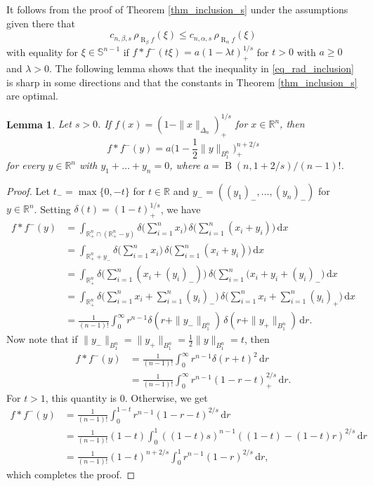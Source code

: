 \documentclass{amsart}
\newtheorem{lemma}[theorem]{Lemma}
\newcommand{\omr}[1]{\operatorname{R}_{#1}\!}
\newcommand{\R}{\mathbb R}
\newcommand{\sn}{{\mathbb S}^{n-1}}
\newcommand{\Beta}{\operatorname{B}}
\renewcommand{\d}{\,\mathrm{d}}
\newcommand{\pl}[1]{#1_{\scriptscriptstyle +}}
\newcommand{\mn}[1]{#1_{\scriptscriptstyle -}}
\begin{document}
It follows from the proof of Theorem \ref{thm_inclusion_s} under the assumptions given there that
\begin{equation}\label{eq_rad_inclusion}
c_{n,\beta,s}\, \rho_{\omr \beta f}(\xi)
\leq  
c_{n,\alpha,s}\, \rho_{\omr \alpha f}(\xi)
\end{equation}
with equality for $\xi\in\sn$ if $f*f^-(t\xi)= a\pl{(1-\lambda t)}^{1/s}$ for $t>0$ with $a\ge 0$ and $\lambda >0$. The following lemma shows that the inequality in \eqref{eq_rad_inclusion} is sharp in some directions and that the constants in Theorem \ref{thm_inclusion_s} are optimal. 



\begin{lemma}
Let $s>0$. If $f(x) = \pl{(1-\|x\|_{\Delta_n})}^{1/s}$ for $x\in\R^n$, then 
\[
    f*f^-(y) = a \pl{\big(1-\frac 12 \|y\|_{B^n_1}\big)}^{n+2/s} 
\]
for every $y\in\R^n$ with $y_1+\dots+y_n = 0$, where $a=\Beta(n,1+2/s)/(n-1)!$.

\end{lemma}

\begin{proof} Let $\mn{t}=\max\{0,-t\}$ for $t\in\R$ and $\mn{y}=(\mn{(y_1)}, \dots, \mn{(y_n)})$ for $y\in\R^n$.  Setting $\delta(t) = \pl{(1-t)}^{1/s}$, we have
\begin{align}
f*f^-(y)
&= \int_{\R^n_+\cap (\R^n_+-y)}  \delta\big( \sum_{i=1}^n x_i \big)\, \delta\big( \sum_{i=1}^n (x_i + y_i) \big) \d x \\
&= \int_{\R^n_++\mn{y}} \delta\big( \sum_{i=1}^n x_i \big)\, \delta\big( \sum_{i=1}^n (x_i + y_i) \big) \d x \\
&= \int_{\R^n_+} \delta\big( \sum_{i=1}^n (x_i+\mn{(y_i)})\big) \,\delta\big( \sum_{i=1}^n (x_i + y_i+\mn{(y_i)} \big) \d x \\
&= \int_{\R^n_+} \delta\big( \sum_{i=1}^n x_i+\sum_{i=1}^n \mn{(y_i)} \big) \,\delta\big( \sum_{i=1}^n x_i + \sum_{i=1}^n \pl{(y_i)} ) \d x \\
&= \frac1{(n-1)!} \int_0^\infty r^{n-1} \delta( r + \|\mn{y}\|_{B^n_1} ) \,\delta( r + \|\pl{y}\|_{B^n_1} ) \d r.
\end{align}
Now note that if  $\|\mn{y}\|_{B^n_1} = \|\pl{y}\|_{B^n_1} = \frac 12 \|y\|_{B^n_1}=t$, then
\begin{align}
f*f^-(y)
&= \frac1{(n-1)!} \int_0^\infty r^{n-1} \delta( r + t)^2 \d r \\
&= \frac1{(n-1)!} \int_0^\infty r^{n-1} \pl{(1 - r - t)}^{2/s} \d r. 
\end{align}
For $t > 1$, this quantity is $0$. Otherwise, we get
\begin{align}
f*f^-(y)
&= \frac1{(n-1)!} \int_0^{1-t} r^{n-1} (1 - r - t)^{2/s} \d r \\
&= \frac1{(n-1)!} (1 - t) \int_0^1 ((1 - t)s)^{n-1} ((1 - t) - (1 - t) r)^{2/s} \d r \\
&= \frac1{(n-1)!} (1 - t)^{n+2/s} \int_0^1 r^{n-1} (1-r)^{2/s} \d r, 
\end{align}
which completes the proof.
\end{proof}
\end{document}
